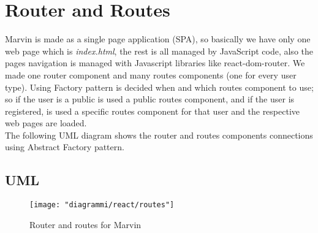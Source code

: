 \documentclass[../react]{subfiles}
\begin{document}
	
	\section{Router and Routes} Marvin is made as a single page application (SPA), so basically we have only one web page which is \textit{index.html}, the rest is all managed by JavaScript code, also the pages navigation is managed with Javascript libraries like react-dom-router. We made one router component and many routes components (one for every user type). Using Factory pattern is decided when and which routes component to use; so if the user is a public is used a public routes component, and if the user is registered, is used a specific routes component for that user and the respective web pages are loaded. \\
	The following UML diagram shows the router and routes components connections using Abstract Factory pattern.
		\subsection{UML}
			\begin{figure}[h]
			\centering
			\texttt{[image: "diagrammi/react/routes"]}
			\caption{Router and routes for Marvin}
			\label{fig:Router and routes for Marvin}
		\end{figure}
		\newpage
	
\end{document}
